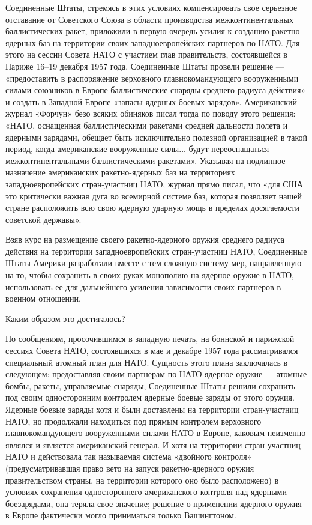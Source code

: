 \documentclass[12pt, a4paper, openany]{book}
\begin{document}
Соединенные Штаты, стремясь в этих условиях компенсировать свое серьезное отставание от Советского Союза в области производства межконтинентальных баллистических ракет, приложили в первую очередь усилия к созданию ракетно-ядерных баз на территории своих западноевропейских партнеров по НАТО. Для этого на сессии Совета НАТО с участием глав правительств, состоявшейся в Париже 16–19 декабря 1957 года, Соединенные Штаты провели решение — «предоставить в распоряжение верховного главнокомандующего вооруженными силами союзников в Европе баллистические снаряды среднего радиуса действия» и создать в Западной Европе «запасы ядерных боевых зарядов». Американский журнал «Форчун» безо всяких обиняков писал тогда по поводу этого решения: «НАТО, оснащенная баллистическими ракетами средней дальности полета и ядерными зарядами, обещает быть исключительно полезной организацией в такой период, когда американские вооруженные силы... будут переоснащаться межконтинентальными баллистическими ракетами». Указывая на подлинное назначение американских ракетно-ядерных баз на территориях западноевропейских стран-участниц НАТО, журнал прямо писал, что «для США это критически важная дуга во всемирной системе баз, которая позволяет нашей стране расположить всю свою ядерную ударную мощь в пределах досягаемости советской державы».
	
Взяв курс на размещение своего ракетно-ядерного оружия среднего радиуса действия на территории западноевропейских стран-участниц НАТО, Соединенные Штаты Америки разработали вместе с тем сложную систему мер, направленную на то, чтобы сохранить в своих руках монополию на ядерное оружие в НАТО, использовать ее для дальнейшего усиления зависимости своих партнеров в военном отношении.
	
Каким образом это достигалось?
	
По сообщениям, просочившимся в западную печать, на боннской и парижской сессиях Совета НАТО, состоявшихся в мае и декабре 1957 года рассматривался специальный атомный план для НАТО. Сущность этого плана заключалась в следующем: предоставляя своим партнерам по НАТО ядерное оружие — атомные бомбы, ракеты, управляемые снаряды, Соединенные Штаты решили сохранить под своим односторонним контролем ядерные боевые заряды от этого оружия. Ядерные боевые заряды хотя и были доставлены на территории стран-участниц НАТО, но продолжали находиться под прямым контролем верховного главнокомандующего вооруженными силами НАТО в Европе, каковым неизменно являлся и является американский генерал. И хотя на территории стран-участниц НАТО и действовала так называемая система «двойного контроля» (предусматривавшая право вето на запуск ракетно-ядерного оружия правительством страны, на территории которого оно было расположено) в условиях сохранения одностороннего американского контроля над ядерными боезарядами, она теряла свое значение; решение о применении ядерного оружия в Европе фактически могло приниматься только Вашингтоном.
	
\end{document}
